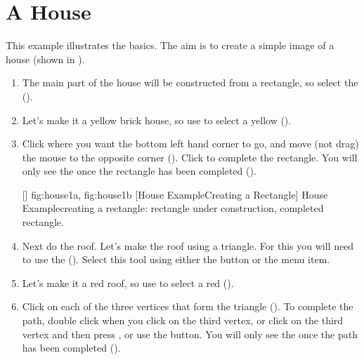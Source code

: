 \section{A House}\label{sec:houseexample}

This example illustrates the basics. The aim is to create a simple
image of a house (shown in ).

\begin{enumerate}

\item The main part of the house will be constructed from a
rectangle, so select the  ().

\item Let's make it a
yellow brick house, so use  to select
a yellow  ().

\item Click where you want the bottom left hand corner to go, and
move (not drag) the mouse to the opposite corner
().  Click to complete the rectangle. You
will only see the  once the rectangle has been
completed ().

[]
{
 {fig:house1a}{}{},
 {fig:house1b}{}{}
}
[House Example\dash Creating a Rectangle]
{House Example\dash creating a rectangle:
 rectangle under construction,
 completed rectangle.}

\item Next do the roof. Let's make the roof using a triangle.
For this you will need to use the
 (). Select this
tool using either the  button or
the  menu item.

\item Let's make it a red roof, so use
 to select a red
 ().

\item Click on each of the three vertices that form the triangle
(). To complete the \gls{path}, double click
when you click on the third vertex, or click on the third vertex and
then press , or use the
 button.  You will only see the
 once the path has been completed
().


\end{enumerate}
